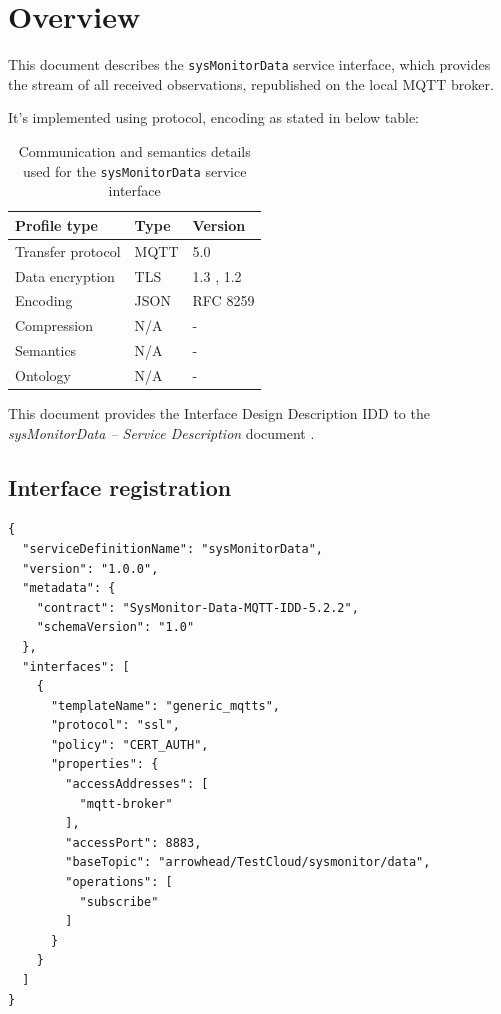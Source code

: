 \documentclass[a4paper]{arrowhead}
\begin{document}
\section{Overview}
\label{sec:overview}

This document describes the \texttt{sysMonitorData} service interface, which provides the stream of all received observations, republished on the local MQTT broker.

It's implemented using protocol, encoding as stated in below table:
\begin{table}[ht!]
  \centering
  \begin{tabular}{|l|l|l|}
    \hline
    \rowcolor{gray!33} Profile type & Type & Version \\ \hline
    Transfer protocol & MQTT & 5.0 \\ \hline
    Data encryption & TLS & 1.3 \cite{rfc8446}, 1.2 \cite{rfc5246} \\ \hline
    Encoding & JSON & RFC 8259 \cite{rfc8259} \\ \hline
    Compression & N/A & - \\ \hline
    Semantics & N/A & - \\ \hline
    Ontology & N/A & - \\ \hline
  \end{tabular}
  \caption{Communication and semantics details used for the \texttt{sysMonitorData} service interface}
  \label{tab:comunication_semantics_profile}
\end{table}

This document provides the Interface Design Description IDD to the \textit{sysMonitorData -- Service Description} document \cite{smo-sysMonitorData-sd}.

\subsection{Interface registration}

\begin{lstlisting}[caption={Registered service instance (TestCloud).}]
{
  "serviceDefinitionName": "sysMonitorData",
  "version": "1.0.0",
  "metadata": {
    "contract": "SysMonitor-Data-MQTT-IDD-5.2.2",
    "schemaVersion": "1.0"
  },
  "interfaces": [
    {
      "templateName": "generic_mqtts",
      "protocol": "ssl",
      "policy": "CERT_AUTH",
      "properties": {
        "accessAddresses": [
          "mqtt-broker"
        ],
        "accessPort": 8883,
        "baseTopic": "arrowhead/TestCloud/sysmonitor/data",
        "operations": [
          "subscribe"
        ]
      }
    }
  ]
}
\end{lstlisting}
\end{document}
